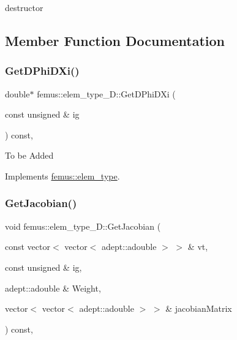destructor 

\subsection{Member Function Documentation}
\mbox{\label{classfemus_1_1elem__type__1_d_a27ff9f2a7f26c961b9b9d96aa87723d2}} 
\subsubsection{\texorpdfstring{Get\+D\+Phi\+D\+Xi()}{GetDPhiDXi()}}
{\footnotesize\ttfamily double$\ast$ femus\+::elem\+\_\+type\+\_\+D\+::\+Get\+D\+Phi\+D\+Xi (\begin{DoxyParamCaption}\item[{const unsigned \&}]{ig }\end{DoxyParamCaption}) const\hspace{0.3cm}{\ttfamily [inline]}, {\ttfamily [virtual]}}

To be Added 

Implements \mbox{\hyperlink{classfemus_1_1elem__type_a6efb6026b9fe89912ec367b235bfccc7}{femus\+::elem\+\_\+type}}.

\mbox{\label{classfemus_1_1elem__type__1_d_af21e2d104c0f4ca0d18e5e51c8f5c91f}} 
\subsubsection{\texorpdfstring{Get\+Jacobian()}{GetJacobian()}\hspace{0.1cm}{\footnotesize\ttfamily [1/2]}}
{\footnotesize\ttfamily void femus\+::elem\+\_\+type\+\_\+D\+::\+Get\+Jacobian (\begin{DoxyParamCaption}\item[{const vector$<$ vector$<$ adept\+::adouble $>$ $>$ \&}]{vt,  }\item[{const unsigned \&}]{ig,  }\item[{adept\+::adouble \&}]{Weight,  }\item[{vector$<$ vector$<$ adept\+::adouble $>$ $>$ \&}]{jacobian\+Matrix }\end{DoxyParamCaption}) const\hspace{0.3cm}{\ttfamily [inline]}, {\ttfamily [virtual]}}



